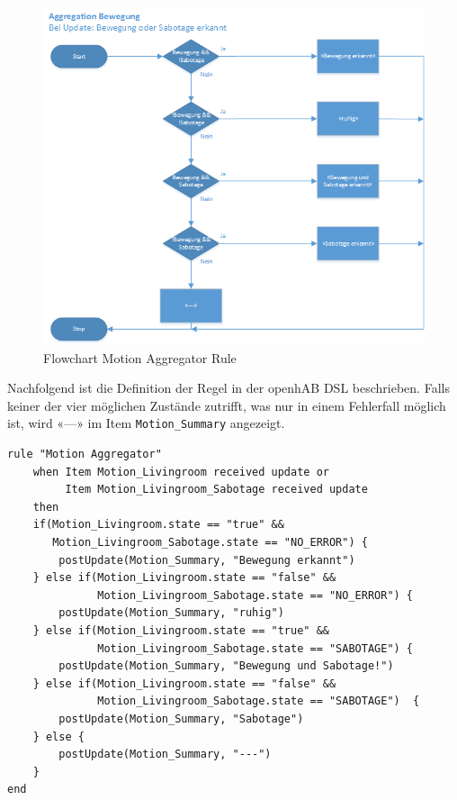 \begin{figure}[H]
	\centering
		\includegraphics[scale=0.8]{report/img/RuleMotionAggregator}
	\caption{Flowchart Motion Aggregator Rule}
	\label{fig:flowChartMotionAggregator}
\end{figure}

Nachfolgend ist die Definition der Regel in der openhAB DSL beschrieben. Falls keiner der vier möglichen Zustände zutrifft, was nur in einem Fehlerfall möglich ist, wird «---» im Item \lstinline!Motion_Summary! angezeigt.

\begin{lstlisting}[style=csharp, caption=demo.rules - Rule «Motion Aggregator»]
rule "Motion Aggregator"
	when Item Motion_Livingroom received update or
	     Item Motion_Livingroom_Sabotage received update
	then
	if(Motion_Livingroom.state == "true" &&
	   Motion_Livingroom_Sabotage.state == "NO_ERROR") {
		postUpdate(Motion_Summary, "Bewegung erkannt")
	} else if(Motion_Livingroom.state == "false" && 
	          Motion_Livingroom_Sabotage.state == "NO_ERROR") {
		postUpdate(Motion_Summary, "ruhig")	
	} else if(Motion_Livingroom.state == "true" &&
	          Motion_Livingroom_Sabotage.state == "SABOTAGE") {
		postUpdate(Motion_Summary, "Bewegung und Sabotage!")
	} else if(Motion_Livingroom.state == "false" &&
	          Motion_Livingroom_Sabotage.state == "SABOTAGE")  {
		postUpdate(Motion_Summary, "Sabotage")
	} else {
		postUpdate(Motion_Summary, "---")
	}
end
\end{lstlisting}

